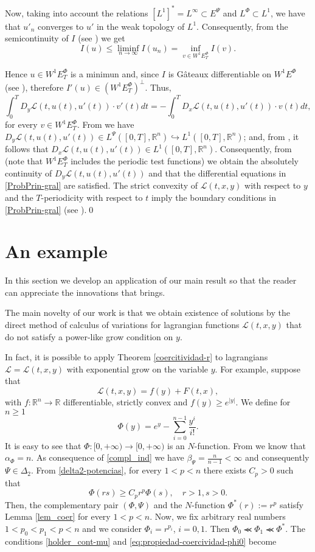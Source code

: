 \documentclass[twoside]{elsarticle}
\theoremstyle{remark}
\newcommand{\lphi}{L^{\Phi}}
\newcommand{\lpsi}{L^{\Psi}}
\newcommand{\ephi}{E^{\Phi}}
\newcommand{\wphiet}{W^{1}\ephi_T}
\newcommand{\wphie}{W^{1}\ephi}
\newcommand{\rr}{\mathbb{R}}
\renewcommand{\leq}{\leqslant}
\renewcommand{\geq}{\geqslant}
\newcommand{\epsi}{E^{\Psi}}
\newcounter{example}
\begin{document}
Now, taking into account the relations $\left[L^1\right]^*=L^{\infty}\subset  \epsi$ and $\lphi\subset L^1$, we have that $u'_n$ converges to $u'$ in the weak topology of $L^1$. Consequently,  from the semicontinuity of $I$ (see \cite[Lemma 6.1]{ABGMS2015})  we get 
\[I(u)\leq  \liminf_{n\to\infty}I(u_n)=\inf\limits_{v\in\wphie_T}I(v).\]

Hence $u\in \wphiet$ is a minimun and, since $I$ is G\^ateaux differentiable on $\wphie$ (see  \cite[Thm. 3.2]{ABGMS2015}), 
therefore $I'(u)\in (\wphiet)^{\perp}$. Thus,
\[\int_0^T D_y\mathcal{L}(t,u(t),u'(t))\cdot v'(t)dt =-\int_0^T D_x\mathcal{L}(t,u(t),u'(t))\cdot v(t)dt,\]
for every  $v\in \wphiet$.  
From \cite[Eq. (26)]{ABGMS2015} we have
 $D_y\mathcal{L}(t,u(t),u'(t))\in \lpsi([0,T],\rr^n)\hookrightarrow L^1([0,T],\rr^n)$;
and,  from  \cite[Eq. (24)]{ABGMS2015}, it follows that $D_x\mathcal{L}(t,u(t),u'(t))\in L^1([0,T],\rr^n)$. 
Consequently, from \cite[p. 6]{mawhin2010critical} 
(note that $\wphiet$  includes the periodic test functions) we obtain the absolutely continuity of $D_y\mathcal{L}(t,u(t),u'(t))$ and that the differential equations in \eqref{ProbPrin-gral} are satisfied. The strict convexity of $\mathcal{L}(t,x,y)$ with respect to $y$ and the $T$-periodicity with respect to $t$ imply the boundary conditions in  \eqref{ProbPrin-gral} (see \cite[Thm. 4.1]{ABGMS2015}).\qed




 \section{An example}\label{sec:examples}

 In this section we develop  an application of our main result
so that the reader can appreciate the innovations that brings.


The main novelty  of our work is that we obtain existence of solutions by the direct method of calculus of variations for lagrangian functions $\mathcal{L}(t,x,y)$ that do not satisfy a power-like grow condition on $y$.

In fact, it is possible to apply Theorem \ref{coercitividad-r} to lagrangians $\mathcal{L}=\mathcal{L}(t,x,y)$ with  exponential grow on the variable $y$. For example, suppose that
  \[\mathcal{L}(t,x,y)=f(y)+F(t,x),\]
with $f:\rr^n\to\rr$ differentiable, strictly convex and $f(y)\geq e^{|y|}$. We define for $n\geq 1$
\[\Phi(y)=e^y-\sum\limits_{i=0}^{n-1}\frac{y^i}{i!}.  \]
It is easy to see that $\Phi:[0,+\infty)\to [0,+\infty)$  is an $N$-function. 
From \cite[Ex. 3, p. 85]{M} we know that $\alpha_{\Phi}=n$. 
As consequence of \eqref{compl_ind} we have $\beta_{\Psi}=\frac{n}{n-1}<\infty$ and consequently $\Psi\in\Delta_2$. 
From \eqref{delta2-potencias}, for every $1<p<n$ there exists $C_p>0$ such that
\[\Phi(rs)\geq C_pr^p\Phi(s),\quad r>1,s>0.\]
Then, the complementary pair $(\Phi,\Psi)$ and the $N$-function $\Phi^*(r):=r^p$ satisfy Lemma \ref{lem_coer} for every $1<p<n$. 
Now, we fix arbitrary real numbers $1<p_0<p_1<p<n$ and we consider $\Phi_i=r^{p_i}$, $i=0,1$. 
Then $\Phi_0\llcurly \Phi_1\llcurly \Phi^*$.
The conditions  \eqref{holder_cont-mu} and     \eqref{eq:propiedad-coercividad-phi0} become
\end{document}
